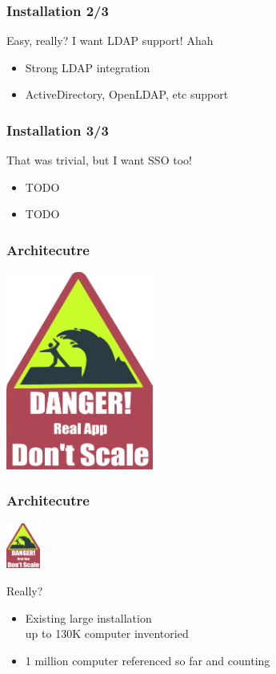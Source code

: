 \documentclass{beamer}
\begin{document}
\begin{frame}
    \frametitle{Installation 2/3}

    \begin{block}{Easy, really? I want LDAP support! Ahah}
        \begin{itemize}
            \item Strong LDAP integration
            \item ActiveDirectory, OpenLDAP, etc support
        \end{itemize}
    \end{block}

\end{frame}

\begin{frame}
    \frametitle{Installation 3/3}

    \begin{block}{That was trivial, but I want SSO too!}
        \begin{itemize}
            \item TODO
            \item TODO
        \end{itemize}
    \end{block}

\end{frame}

\begin{frame}
    \frametitle{Architecutre}

    \includegraphics[height=6.5cm]{pics/scale.pdf}

\end{frame}

\begin{frame}
    \frametitle{Architecutre}

    \includegraphics[height=1.5cm]{pics/scale.pdf}
    \begin{block}{Really?}
        \begin{itemize}
            \item Existing large installation \\
            {\small up to 130K computer inventoried}
            \item 1 million computer referenced so far and counting
        \end{itemize}
    \end{block}

\end{frame}
\end{document}
